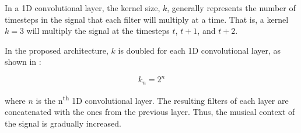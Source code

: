 
In a 1D convolutional layer, the kernel size, $k$, generally
represents the number of timesteps in the signal that each
filter will multiply at a time. That is, a kernel $k=3$ will
multiply the signal at the timesteps $t$, $t+1$, and $t+2$.

In the proposed architecture, $k$ is doubled for each 1D
convolutional layer, as shown in :

\begin{equation}
    \label{eq:kernel_size}
    k_n = 2^{n}
\end{equation}

where $n$ is the n\textsuperscript{th} 1D convolutional
layer. The resulting filters of each layer are concatenated
with the ones from the previous layer. Thus, the musical
context of the signal is gradually increased.
